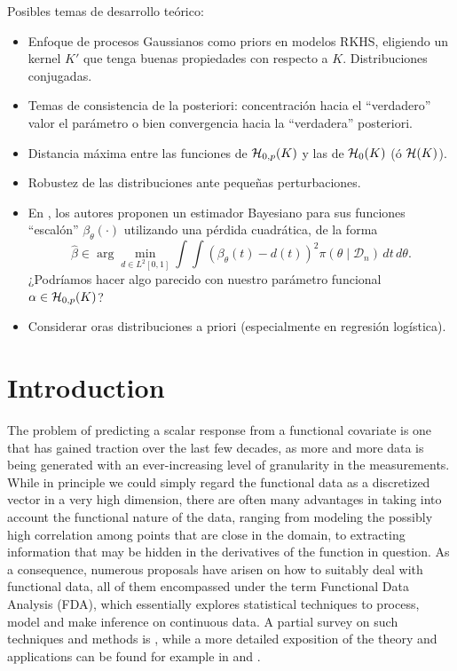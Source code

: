 \documentclass[ba]{imsart}
\numberwithin{equation}{section}
\theoremstyle{plain}
\newcommand{\Hcal}{\ensuremath\mathcal{H}}
\newenvironment{comment}[1][comment-red]
{
\noindent \color{#1}
}
{
\color{black}
}
\begin{document}
\begin{comment}
Posibles temas de desarrollo teórico:
  \begin{itemize}
    \item Enfoque de procesos Gaussianos como priors en modelos RKHS, eligiendo un kernel \(K'\) que tenga buenas propiedades con respecto a \(K\). Distribuciones conjugadas.
    \item Temas de consistencia de la posteriori: concentración hacia el ``verdadero'' valor el parámetro o bien convergencia hacia la ``verdadera'' posteriori.
    \item Distancia máxima entre las funciones de \(\Hcal_{0,p}(K)\) y las de \(\Hcal_0(K)\) (ó \(\Hcal(K)\)).
    \item Robustez de las distribuciones ante pequeñas perturbaciones.
    \item  En \citet[Sec.~2.5]{grollemund2019bayesian}, los autores proponen un estimador Bayesiano para sus funciones ``escalón'' \(\beta_\theta(\cdot)\) utilizando una pérdida cuadrática, de la forma
  \[
    \hat \beta \in \arg\min_{d\in L^2[0, 1]} \int\int (\beta_\theta(t) - d(t))^2 \pi(\theta\mid \mathcal D_n)\, dt\, d\theta.
  \]
  ¿Podríamos hacer algo parecido con nuestro parámetro funcional \(\alpha \in \Hcal_{0,p}(K)\)?
  \item Considerar oras distribuciones a priori (especialmente en regresión logística).
  \end{itemize}
\end{comment}

\section{Introduction}\label{sec:intro}

The problem of predicting a scalar response from a functional covariate is one that has gained traction over the last few decades, as more and more data is being generated with an ever-increasing level of granularity in the measurements. While in principle we could simply regard the functional data as a discretized vector in a very high dimension, there are often many advantages in taking into account the functional nature of the data, ranging from modeling the possibly high correlation among points that are close in the domain, to extracting information that may be hidden in the derivatives of the function in question. As a consequence, numerous proposals have arisen on how to suitably deal with functional data, all of them encompassed under the term Functional Data Analysis (FDA), which essentially explores statistical techniques to process, model and make inference on continuous data. A partial survey on such techniques and methods is \citet{cuevas2014partial}, while a more detailed exposition of the theory and applications can be found for example in \citet{hsing2015theoretical} and \citet{horváth2012inference}.
\end{document}
